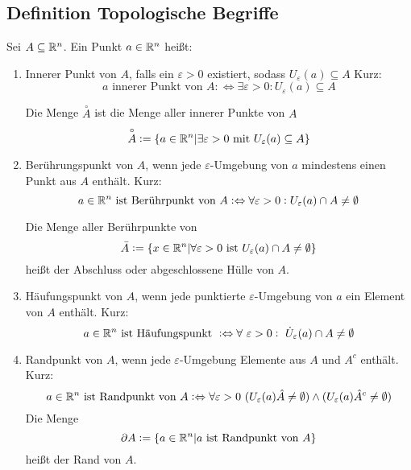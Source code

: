 \subsection{Definition Topologische Begriffe}
Sei $A \subseteq \mathbb{R}^n$. Ein Punkt $a \in \mathbb{R}^n$ heißt:
\begin{enumerate}[label= (\alph*)]
    \item Innerer Punkt von $A$, falls ein $\varepsilon > 0$ existiert, sodass
        $U_\varepsilon(a) \subseteq A$
        Kurz:
        \begin{equation*}
            a \text{ innerer Punkt von }A :\Leftrightarrow \exists \varepsilon>0
            : U_\varepsilon(a) \subseteq A
        \end{equation*}

        Die Menge $\overset{\circ}{A}$ ist die Menge aller innerer Punkte von $A$
        \begin{equation*}
            \overset{\circ}{A} := \{ a \in \mathbb{R}^n | \exists \varepsilon > 0 \text{ mit }
            U_\varepsilon(a) \subseteq A \}
        \end{equation*}
    \item Berührungspunkt von $A$, wenn jede $\varepsilon$-Umgebung von $a$ mindestens
        einen Punkt aus $A$ enthält.
        Kurz:
        \begin{equation*}
            a \in \mathbb{R}^n \text{ ist Berührpunkt von } A :\Leftrightarrow
            \forall \varepsilon>0: U_\varepsilon(a) \cap A \neq \emptyset
        \end{equation*}

        Die Menge aller Berührpunkte von
        \begin{equation*}
            \bar{A} := \{ x \in \mathbb{R}^n | \forall \varepsilon > 0 \text{ ist }
            U_\varepsilon(a) \cap A \neq \emptyset \}
        \end{equation*}
        heißt der Abschluss oder abgeschlossene Hülle von $A$.
    \item Häufungspunkt von $A$, wenn jede punktierte $\varepsilon$-Umgebung von
        $a$ ein Element von $A$ enthält.
        Kurz:
        \begin{equation*}
            a \in \mathbb{R}^n \text{ ist Häufungspunkt } :\Leftrightarrow
            \forall\ \varepsilon > 0:\ \dot{U}_\varepsilon(a) \cap A \neq \emptyset
        \end{equation*}
    \item Randpunkt von $A$, wenn jede $\varepsilon$-Umgebung Elemente aus $A$
        und $A^c$ enthält.
        Kurz:
        \begin{equation*}
            a \in \mathbb{R}^n \text{ ist Randpunkt von }A :\Leftrightarrow
            \forall \varepsilon > 0\
            (U_\varepsilon(a) \hat A \neq \emptyset) \land
            (U_\varepsilon(a) \hat A^c \neq \emptyset)
        \end{equation*}
        Die Menge
        \begin{equation*}
            \partial A := \{ a \in \mathbb{R}^n | a \text{ ist Randpunkt von }A \}
        \end{equation*}
        heißt der Rand von $A$.
\end{enumerate}

